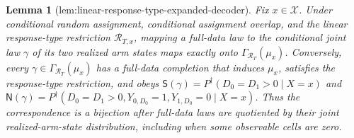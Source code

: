 \documentclass{article}
\newtheorem{lemma}{Lemma}
\begin{document}
\begin{lemma}[lem:linear-response-type-expanded-decoder]\label{lem:linear-response-type-expanded-decoder}
Fix \(x\in\mathcal X\).  Under conditional random assignment, conditional assignment overlap, and the linear response-type restriction \(\mathcal R_{T,x}\), mapping a full-data law to the conditional joint law \(\gamma\) of its two realized arm states maps exactly onto \(\Gamma_{\mathcal R_T}(\mu_x)\).  Conversely, every \(\gamma\in\Gamma_{\mathcal R_T}(\mu_x)\) has a full-data completion that induces \(\mu_x\), satisfies the response-type restriction, and obeys \(\mathsf S(\gamma)=P^{\dagger}(D_0=D_1>0\mid X=x)\) and \(\mathsf N(\gamma)=P^{\dagger}(D_0=D_1>0,Y_{0,D_0}=1,Y_{1,D_0}=0\mid X=x)\).  Thus the correspondence is a bijection after full-data laws are quotiented by their joint realized-arm-state distribution, including when some observable cells are zero.
\end{lemma}
\end{document}
